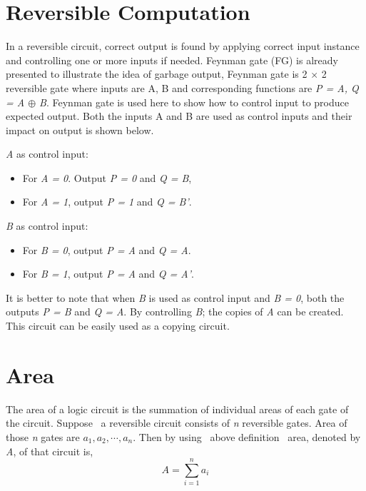 \section{Reversible Computation}
In a reversible circuit, correct output is found by applying correct input instance and controlling one or more inputs if needed. Feynman gate (FG) is already presented to illustrate the idea of garbage output, Feynman gate is 2 $\times$ 2 reversible gate where inputs are A, B and corresponding functions are \textit{P = A, Q = A $\oplus$ B}. Feynman gate is used here to show how to control input to produce expected output. Both the inputs A and B are used as control inputs and their impact on output is shown below.

\textit{A} as control input:
\begin{itemize}
\item { } For \textit{A = 0}. Output \textit{P = 0 }and \textit{Q = B},
\item { } For \textit{A = 1}, output \textit{P = 1} and \textit{Q = B'}.

\end{itemize}

\textit{B} as control input:
\begin{itemize}
\item For \textit{B = 0}, output \textit{P = A} and \textit{Q = A}.
\item For \textit{B = 1}, output \textit{P = A} and\textit{ Q = A'}.

\end{itemize}

It is better to note that when \textit{B} is used as control input and \textit{B = 0}, both the outputs \textit{P = B} and \textit{Q = A}. By controlling \textit{B}; the copies of \textit{A} can be created. This circuit can be easily used as a copying circuit.

\section{Area}
The area of a logic circuit is the summation of individual areas of each gate of the circuit. Suppose~ a reversible circuit consists of \textit{n} reversible gates. Area of those \textit{n} gates are $a_1, a_2,\cdots, a_n$. Then by using~ above definition~ area, denoted by \textit{A}, of that circuit is,
\begin{equation*}
A=\sum_{i=1}^{n}a_i
\end{equation*}

